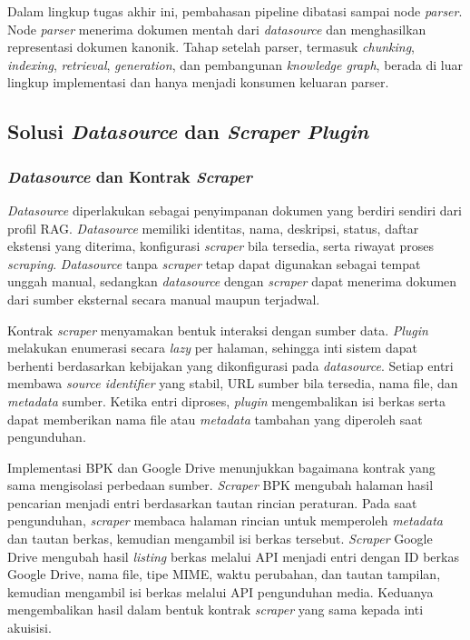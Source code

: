 Dalam lingkup tugas akhir ini, pembahasan pipeline dibatasi sampai node \textit{parser}.
Node \textit{parser} menerima dokumen mentah dari \textit{datasource} dan menghasilkan representasi dokumen kanonik.
Tahap setelah parser, termasuk \textit{chunking}, \textit{indexing}, \textit{retrieval}, \textit{generation}, dan pembangunan \textit{knowledge graph}, berada di luar lingkup implementasi dan hanya menjadi konsumen keluaran parser.

\subsection{Solusi \textit{Datasource} dan \textit{Scraper Plugin}}
\label{sec:solusi-scraper-plugin}

\subsubsection{\textit{Datasource} dan Kontrak \textit{Scraper}}
\label{sec:solusi-scraper-adapter}

\textit{Datasource} diperlakukan sebagai penyimpanan dokumen yang berdiri sendiri dari profil RAG.
\textit{Datasource} memiliki identitas, nama, deskripsi, status, daftar ekstensi yang diterima, konfigurasi \textit{scraper} bila tersedia, serta riwayat proses \textit{scraping}.
\textit{Datasource} tanpa \textit{scraper} tetap dapat digunakan sebagai tempat unggah manual, sedangkan \textit{datasource} dengan \textit{scraper} dapat menerima dokumen dari sumber eksternal secara manual maupun terjadwal.

Kontrak \textit{scraper} menyamakan bentuk interaksi dengan sumber data.
\textit{Plugin} melakukan enumerasi secara \textit{lazy} per halaman, sehingga inti sistem dapat berhenti berdasarkan kebijakan yang dikonfigurasi pada \textit{datasource}.
Setiap entri membawa \textit{source identifier} yang stabil, URL sumber bila tersedia, nama file, dan \textit{metadata} sumber.
Ketika entri diproses, \textit{plugin} mengembalikan isi berkas serta dapat memberikan nama file atau \textit{metadata} tambahan yang diperoleh saat pengunduhan.

Implementasi BPK dan Google Drive menunjukkan bagaimana kontrak yang sama mengisolasi perbedaan sumber.
\textit{Scraper} BPK mengubah halaman hasil pencarian menjadi entri berdasarkan tautan rincian peraturan. Pada saat pengunduhan, \textit{scraper} membaca halaman rincian untuk memperoleh \textit{metadata} dan tautan berkas, kemudian mengambil isi berkas tersebut.
\textit{Scraper} Google Drive mengubah hasil \textit{listing} berkas melalui API menjadi entri dengan ID berkas Google Drive, nama file, tipe MIME, waktu perubahan, dan tautan tampilan, kemudian mengambil isi berkas melalui API pengunduhan media.
Keduanya mengembalikan hasil dalam bentuk kontrak \textit{scraper} yang sama kepada inti akuisisi.

